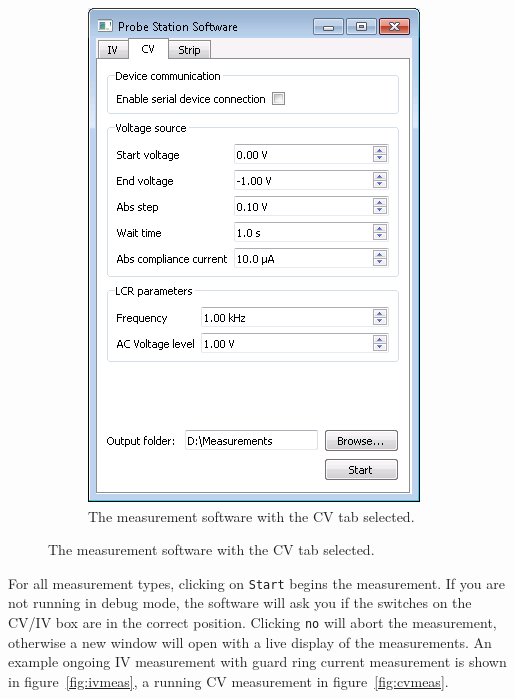 \documentclass[a4paper]{article}
\begin{document}
\begin{figure}[hbtp]
\begin{subfigure}[t]{0.475\textwidth}
\label{fig:softwareopeniv}
\end{subfigure}
\begin{subfigure}[t]{0.475\textwidth}
\centering\captionsetup{width=.8\linewidth}%
\includegraphics[width=\linewidth]{pictures/softcv.png}
\caption[Software with the CV Tab]{The measurement software with the CV tab selected.}
\label{fig:softwareopencv}
\end{subfigure}
\end{figure}

For all measurement types, clicking on {\tt Start} begins the measurement.
If you are not running in debug mode, the software will ask you if the switches on the CV/IV box are in the correct position.
Clicking {\tt no} will abort the measurement, otherwise a new window will open with a live display of the measurements.
An example ongoing IV measurement with guard ring current measurement is shown in figure~\ref{fig:ivmeas}, a running CV measurement in figure~\ref{fig:cvmeas}.\\
\end{document}
